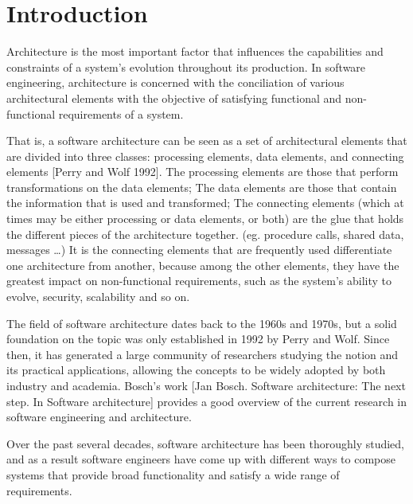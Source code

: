 
%

\chapter{Introduction}
\label{cha:introduction}

Architecture is the most important factor that influences the capabilities and constraints of a system's evolution throughout its production.
In software engineering, architecture is concerned with the conciliation of various architectural elements with the objective of satisfying functional and non-functional requirements of a system.

That is, a software architecture can be seen as a set of architectural elements that are divided into three classes: processing elements, data elements, and connecting elements [Perry and Wolf 1992].
The processing elements are those that perform transformations on the data elements;
The data elements are those that contain the information that is used and transformed;
The connecting elements (which at times may be either processing or data elements, or both) are the glue that holds the different pieces of the architecture together.
(eg. procedure calls, shared data, messages \ldots)
It is the connecting elements that are frequently used differentiate one architecture from another,
because among the other elements, they have the greatest impact on non-functional requirements, such as the system's ability to evolve, security, scalability and so on.

The field of software architecture dates back to the 1960s and 1970s, but a solid foundation on the topic was only established in 1992 by Perry and Wolf.
Since then, it has generated a large community of researchers studying the notion and its practical applications,
allowing the concepts to be widely adopted by both industry and academia.
Bosch's work [Jan Bosch. Software architecture: The next step. In Software architecture] provides a good overview of the current research in software engineering and architecture.

Over the past several decades, software architecture has been thoroughly studied, and as a result software engineers have come up with different ways
to compose systems that provide broad functionality and satisfy a wide range of requirements.

